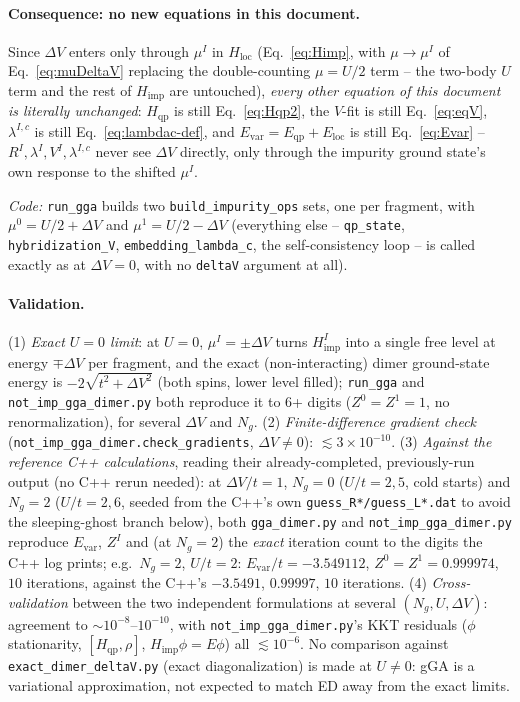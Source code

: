 \documentclass[11pt]{article}
\newcommand{\Ng}{N_{g}}
\newcommand{\Hqp}{H_{\mathrm{qp}}}
\newcommand{\Himp}{H_{\mathrm{imp}}}
\newcommand{\Hloc}{H_{\mathrm{loc}}}
\begin{document}
\paragraph{Consequence: no new equations in this document.} Since $\Delta V$ enters only
through $\mu^I$ in $\Hloc$ (Eq.~\eqref{eq:Himp}, with $\mu\to\mu^I$ of
Eq.~\eqref{eq:muDeltaV} replacing the double-counting $\mu=U/2$ term -- the two-body $U$
term and the rest of $\Himp$ are untouched), \emph{every other equation of this
document is literally unchanged}: $\Hqp$ is still Eq.~\eqref{eq:Hqp2}, the $V$-fit is
still Eq.~\eqref{eq:eqV}, $\lambda^{I,c}$ is still Eq.~\eqref{eq:lambdac-def}, and
$E_{\mathrm{var}}=E_{\mathrm{qp}}+E_{\mathrm{loc}}$ is still Eq.~\eqref{eq:Evar} --
$R^I,\lambda^I,V^I,\lambda^{I,c}$ never see $\Delta V$ directly, only through the
impurity ground state's own response to the shifted $\mu^I$.

\emph{Code:} \texttt{run\_gga} builds two \texttt{build\_impurity\_ops} sets, one per
fragment, with $\mu^0=U/2+\Delta V$ and $\mu^1=U/2-\Delta V$ (everything else --
\texttt{qp\_state}, \texttt{hybridization\_V}, \texttt{embedding\_lambda\_c}, the
self-consistency loop -- is called exactly as at $\Delta V=0$, with no \texttt{deltaV}
argument at all).

\paragraph{Validation.} (1) \emph{Exact $U=0$ limit}: at $U=0$, $\mu^I=\pm\Delta V$ turns
$\Himp^I$ into a single free level at energy $\mp\Delta V$ per fragment, and the exact
(non-interacting) dimer ground-state energy is $-2\sqrt{t^2+\Delta V^2}$ (both spins,
lower level filled); \texttt{run\_gga} and \texttt{not\_imp\_gga\_dimer.py} both
reproduce it to $6$+ digits ($Z^0=Z^1=1$, no renormalization), for several $\Delta V$ and
$\Ng$. (2) \emph{Finite-difference gradient check}
(\texttt{not\_imp\_gga\_dimer.check\_gradients}, $\Delta V\neq0$): $\lesssim3\times10^{-10}$.
(3) \emph{Against the reference C++ calculations}, reading their already-completed,
previously-run output (no C++ rerun needed): at $\Delta V/t=1$, $\Ng=0$ ($U/t=2,5$, cold
starts) and $\Ng=2$ ($U/t=2,6$, seeded from the C++'s own \texttt{guess\_R*/guess\_L*.dat}
to avoid the sleeping-ghost branch below), both \texttt{gga\_dimer.py} and
\texttt{not\_imp\_gga\_dimer.py} reproduce $E_{\mathrm{var}}$, $Z^I$ and (at $\Ng=2$) the
\emph{exact} iteration count to the digits the C++ log prints; e.g.\ $\Ng=2$, $U/t=2$:
$E_{\mathrm{var}}/t=-3.549112$, $Z^0=Z^1=0.999974$, $10$ iterations, against the C++'s
$-3.5491$, $0.99997$, $10$ iterations. (4) \emph{Cross-validation} between the two
independent formulations at several $(\Ng,U,\Delta V)$: agreement to
$\sim10^{-8}$--$10^{-10}$, with \texttt{not\_imp\_gga\_dimer.py}'s KKT residuals
($\phi$ stationarity, $[\Hqp,\rho]$, $\Himp\phi=E\phi$) all $\lesssim10^{-6}$. No
comparison against \texttt{exact\_dimer\_deltaV.py} (exact diagonalization) is made at
$U\neq0$: gGA is a variational approximation, not expected to match ED away from the
exact limits.
\end{document}
